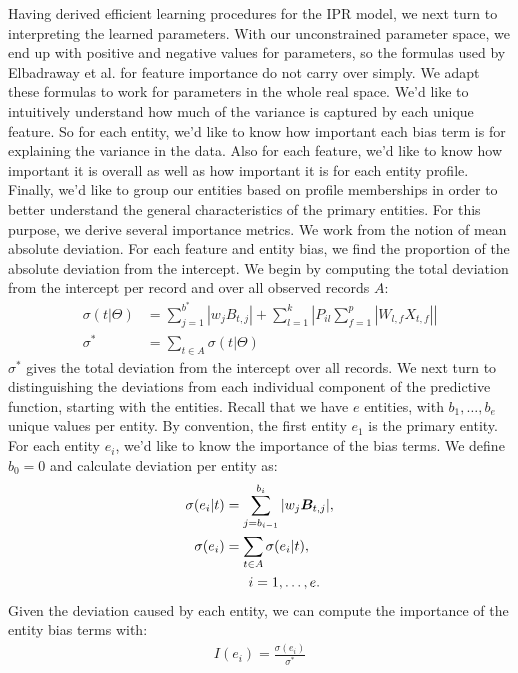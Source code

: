 \documentclass[10pt]{proc}
\newcommand{\elips}[1]{\ldots#1\allowbreak}
\begin{document}
Having derived efficient learning procedures for the IPR model, we next turn to
interpreting the learned parameters. With our unconstrained parameter space, we
end up with positive and negative values for parameters, so the formulas used by
Elbadraway et al. for feature importance do not carry over simply. We adapt
these formulas to work for parameters in the whole real space. We'd like to
intuitively understand how much of the variance is captured by each unique
feature. So for each entity, we'd like to know how important each bias term is
for explaining the variance in the data. Also for each feature, we'd like to
know how important it is overall as well as how important it is for each entity
profile. Finally, we'd like to group our entities based on profile memberships
in order to better understand the general characteristics of the primary
entities. For this purpose, we derive several importance metrics. We work from
the notion of mean absolute deviation. For each feature and entity bias, we find
the proportion of the absolute deviation from the intercept. We begin by
computing the total deviation from the intercept per record and over all
observed records $A$:
%
\begin{align}
    \sigma(t | \Theta) &=
        \sum_{j=1}^{b^*} | w_j B_{t,j} |
        + \sum_{l=1}^k \left|
            P_{il} \sum_{f=1}^p | W_{l,f} X_{t,f} |
        \right|  \\
    \sigma^* &= \sum_{t \in A} \sigma(t | \Theta)
\end{align}
%
$\sigma^*$ gives the total deviation from the intercept over all records. We
next turn to distinguishing the deviations from each individual component of the
predictive function, starting with the entities. Recall that we have $e$
entities, with $b_1, \elips{,} b_e$ unique values per entity. By convention, the
first entity $e_1$ is the primary entity. For each entity $e_i$, we'd like to
know the importance of the bias terms. We define $b_0 = 0$ and calculate
deviation per entity as:
%
\begin{align}
    \sigma(e_i | t) &= \sum_{j=b_{i-1}}^{b_i} | w_j \bm{B}_{t,j} |, \\
    \sigma(e_i) &= \sum_{t \in A} \sigma(e_i | t), \\
    \nonumber
                &\hspace{6mm}i = 1, \elips{,} e.
\end{align}
%
Given the deviation caused by each entity, we can compute the importance of the
entity bias terms with:
%
\begin{align}
    I(e_i) = \frac{\sigma(e_i)}{\sigma^*}
\end{align}
\end{document}
